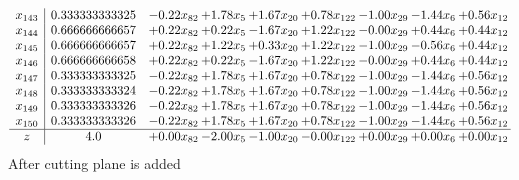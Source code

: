 \documentclass[8pt]{article}
\begin{document}
\[\begin{array}{c| c c@{\hskip 2pt} c@{\hskip 2pt} c@{\hskip 2pt} c@{\hskip 2pt} c@{\hskip 2pt} c@{\hskip 2pt} c@{\hskip 2pt} }
 x_{143}   &  0.333333333325 & -0.22 x_{82} & +  1.78 x_{5} & +  1.67 x_{20} & +  0.78 x_{122} & -1.00 x_{29} & -1.44 x_{6} & +  0.56 x_{12}\\
 x_{144}   &  0.666666666657 & +  0.22 x_{82} & +  0.22 x_{5} & -1.67 x_{20} & +  1.22 x_{122} & -0.00 x_{29} & +  0.44 x_{6} & +  0.44 x_{12}\\
 x_{145}   &  0.666666666657 & +  0.22 x_{82} & +  1.22 x_{5} & +  0.33 x_{20} & +  1.22 x_{122} & -1.00 x_{29} & -0.56 x_{6} & +  0.44 x_{12}\\
 x_{146}   &  0.666666666658 & +  0.22 x_{82} & +  0.22 x_{5} & -1.67 x_{20} & +  1.22 x_{122} & -0.00 x_{29} & +  0.44 x_{6} & +  0.44 x_{12}\\
 x_{147}   &  0.333333333325 & -0.22 x_{82} & +  1.78 x_{5} & +  1.67 x_{20} & +  0.78 x_{122} & -1.00 x_{29} & -1.44 x_{6} & +  0.56 x_{12}\\
 x_{148}   &  0.333333333324 & -0.22 x_{82} & +  1.78 x_{5} & +  1.67 x_{20} & +  0.78 x_{122} & -1.00 x_{29} & -1.44 x_{6} & +  0.56 x_{12}\\
 x_{149}   &  0.333333333326 & -0.22 x_{82} & +  1.78 x_{5} & +  1.67 x_{20} & +  0.78 x_{122} & -1.00 x_{29} & -1.44 x_{6} & +  0.56 x_{12}\\
 x_{150}   &  0.333333333326 & -0.22 x_{82} & +  1.78 x_{5} & +  1.67 x_{20} & +  0.78 x_{122} & -1.00 x_{29} & -1.44 x_{6} & +  0.56 x_{12}\\
\hline
z    &  4.0 & +  0.00 x_{82} & -2.00 x_{5} & -1.00 x_{20} & -0.00 x_{122} & +  0.00 x_{29} & +  0.00 x_{6} & +  0.00 x_{12}\\
\end{array}\]
 After cutting plane is added 
\end{document}

